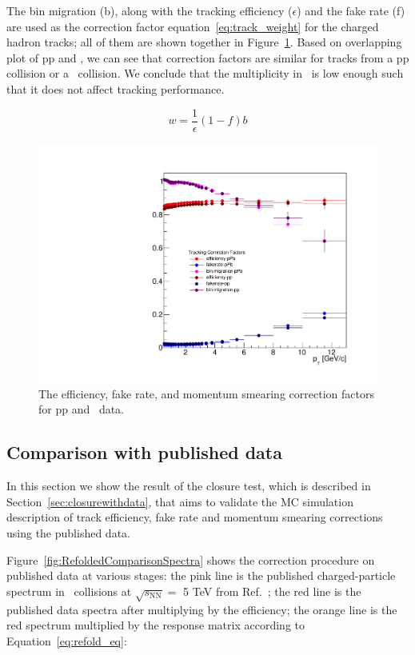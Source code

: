 The bin migration (b), along with the tracking efficiency ($\epsilon$) and the fake rate (f) are used as the correction factor equation~\ref{eq:track_weight} for the charged hadron tracks; all of them are shown together in Figure~\ref{fig:correctionFactors}. Based on overlapping plot of pp and \pPb, we can see that correction factors are similar for tracks from a pp collision or a \pPb~collision. We conclude that the multiplicity in \pPb~is low enough such that it does not affect tracking performance.  

\begin{equation}\label{eq:track_weight}
w = \frac{1}{\epsilon}(1-f)b
\end{equation}

\begin{figure}[h]
\center
\includegraphics[width=.5\textwidth]{Tracking/trackCorrectionFactors_pPbAndpp.pdf}
\caption{The efficiency, fake rate, and momentum smearing correction factors for pp and \pPb~data.}
\label{fig:correctionFactors}
\end{figure}

\subsection{Comparison with published data}
In this section we show the result of the closure test, which is described in Section~\ref{sec:closurewithdata}, that aims to validate the MC simulation description of track efficiency, fake rate and momentum smearing corrections using the published data. 

Figure~\ref{fig:RefoldedComparisonSpectra} shows the correction procedure on published data at various stages: the pink line is the published charged-particle spectrum in \pPb~collisions at {$\sqrt{s_{\mathrm{NN}}}=$ 5 TeV} from Ref.~\cite{Acharya:2018qsh}; the red line is the published data spectra after multiplying by the efficiency; the orange line is the red spectrum multiplied by the response matrix according to Equation~\ref{eq:refold_eq}:

